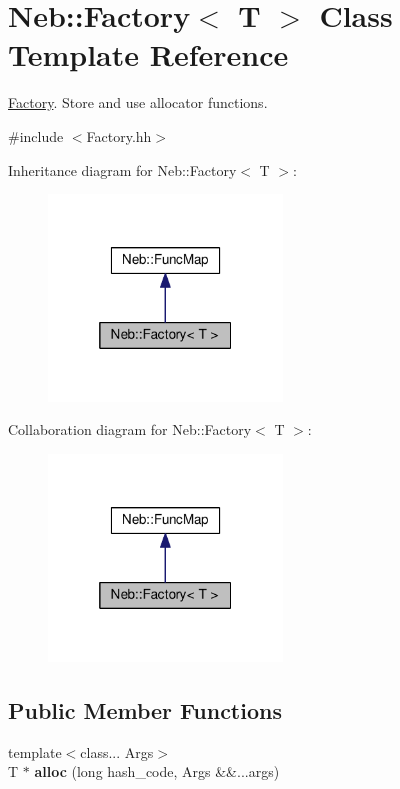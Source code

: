 \hypertarget{classNeb_1_1Factory}{\section{Neb\-:\-:Factory$<$ T $>$ Class Template Reference}
\label{classNeb_1_1Factory}
}


\hyperlink{classNeb_1_1Factory}{Factory}. Store and use allocator functions.  




{\ttfamily \#include $<$Factory.\-hh$>$}



Inheritance diagram for Neb\-:\-:Factory$<$ T $>$\-:
\nopagebreak
\begin{figure}[H]
\begin{center}
\leavevmode
\includegraphics[width=176pt]{classNeb_1_1Factory__inherit__graph}
\end{center}
\end{figure}


Collaboration diagram for Neb\-:\-:Factory$<$ T $>$\-:
\nopagebreak
\begin{figure}[H]
\begin{center}
\leavevmode
\includegraphics[width=176pt]{classNeb_1_1Factory__coll__graph}
\end{center}
\end{figure}
\subsection*{Public Member Functions}
\begin{DoxyCompactItemize}
\item 
\hypertarget{classNeb_1_1Factory_ac499b39e795c35e0894811b2706d5c74}{{\footnotesize template$<$class... Args$>$ }\\T $\ast$ {\bfseries alloc} (long hash\-\_\-code, Args \&\&...args)}\label{classNeb_1_1Factory_ac499b39e795c35e0894811b2706d5c74}

\end{DoxyCompactItemize}


